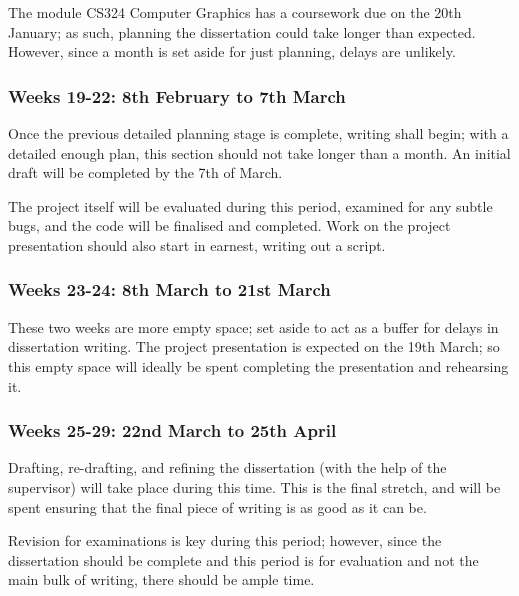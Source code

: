 \documentclass[12pt, a4paper]{scrartcl}
\begin{document}
The module CS324 Computer Graphics has a coursework due on the 20th January; as such, planning the dissertation could take longer than expected. However, since a month is set aside for just planning, delays are unlikely.

\subsubsection{Weeks 19-22: 8th February to 7th March}

Once the previous detailed planning stage is complete, writing shall begin; with a detailed enough plan, this section should not take longer than a month. An initial draft will be completed by the 7th of March.

The project itself will be evaluated during this period, examined for any subtle bugs, and the code will be finalised and completed. Work on the project presentation should also start in earnest, writing out a script.

\subsubsection{Weeks 23-24: 8th March to 21st March}

These two weeks are more empty space; set aside to act as a buffer for delays in dissertation writing. The project presentation is expected on the 19th March; so this empty space will ideally be spent completing the presentation and rehearsing it.

\subsubsection{Weeks 25-29: 22nd March to 25th April}

Drafting, re-drafting, and refining the dissertation (with the help of the supervisor) will take place during this time. This is the final stretch, and will be spent ensuring that the final piece of writing is as good as it can be.

Revision for examinations is key during this period; however, since the dissertation should be complete and this period is for evaluation and not the main bulk of writing, there should be ample time.




\end{document}
